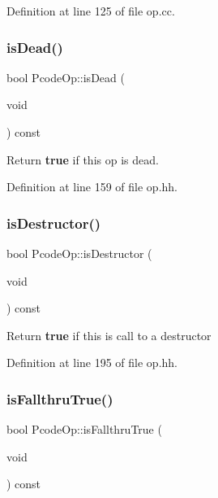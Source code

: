 Definition at line 125 of file op.\+cc.

\mbox{\label{class_pcode_op_a6b24e6d10c6a0cde774cf52e816a636d}} 
\subsubsection{\texorpdfstring{isDead()}{isDead()}}
{\footnotesize\ttfamily bool Pcode\+Op\+::is\+Dead (\begin{DoxyParamCaption}\item[{void}]{ }\end{DoxyParamCaption}) const\hspace{0.3cm}{\ttfamily [inline]}}



Return {\bfseries{true}} if this op is dead. 



Definition at line 159 of file op.\+hh.

\mbox{\label{class_pcode_op_a57ba899d2f042f271f0fc354e7339b29}} 
\subsubsection{\texorpdfstring{isDestructor()}{isDestructor()}}
{\footnotesize\ttfamily bool Pcode\+Op\+::is\+Destructor (\begin{DoxyParamCaption}\item[{void}]{ }\end{DoxyParamCaption}) const\hspace{0.3cm}{\ttfamily [inline]}}

Return {\bfseries{true}} if this is call to a destructor 

Definition at line 195 of file op.\+hh.

\mbox{\label{class_pcode_op_af43ab623809f537adde0f3233e6a1df5}} 
\subsubsection{\texorpdfstring{isFallthruTrue()}{isFallthruTrue()}}
{\footnotesize\ttfamily bool Pcode\+Op\+::is\+Fallthru\+True (\begin{DoxyParamCaption}\item[{void}]{ }\end{DoxyParamCaption}) const\hspace{0.3cm}{\ttfamily [inline]}}



